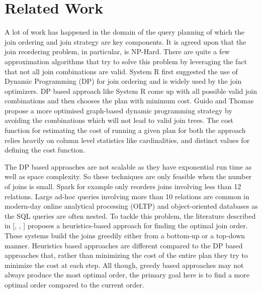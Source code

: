 \section{Related Work}
A lot of work has happened in the domain of the query planning of which the join ordering and join strategy are key components. It is agreed upon that the join reordering problem, in particular, is NP-Hard. There are quite a few approximation algorithms that try to solve this problem by leveraging the fact that not all join combinations are valid. System R \cite{b1} first suggested the use of Dynamic Programming (DP) for join ordering and is widely used by the join optimizers. DP based approach like System R come up with all possible valid join combinations and then chooses the plan with minimum cost. Guido and Thomas \cite{b3} propose a more optimised graph-based dynamic programming strategy by avoiding the combinations which will not lead to valid join trees. The cost function for estimating the cost of running a given plan for both the approach relies heavily on column level statistics like cardinalities, and distinct values for defining the cost function.

The DP based approaches are not scalable as they have exponential run time as well as space complexity. So these techniques are only feasible when the number of joins is small. Spark for example only reorders joins involving less than 12 relations. Large ad-hoc queries involving more than 10 relations are common in modern-day online analytical processing (OLTP) and object-oriented databases as the SQL queries are often nested. To tackle this problem,  the literature described in [\cite{b4}, \cite{b5}, \cite{b6}] proposes a heuristics-based approach for finding the optimal join order. These systems build the joins greedily either from a bottom-up or a top-down manner.  Heuristics based approaches are different compared to the DP based approaches that, rather than minimizing the cost of the entire plan they try to minimize the cost at each step. All though, greedy based approaches may not always produce the most optimal order, the primary goal here is to find a more optimal order compared to the current order.

